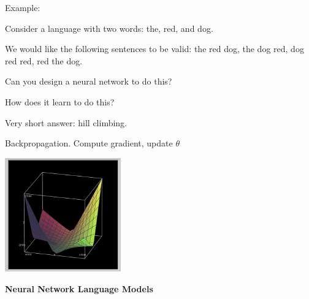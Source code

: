 \documentclass{beamer}
\let\tempone\itemize
\let\temptwo\enditemize
\renewenvironment{itemize}{\tempone\addtolength{\itemsep}{0.5\baselineskip}}{\temptwo}
\newcommand{\air}{\vspace{0.25cm}}
\begin{document}
\begin{frame}
  Example:
  
  \begin{itemize}
  \item Consider a language with two words: the, red, and dog. 
  \item We would like the following sentences to be valid: the red dog, the dog red, dog red red, red the dog.

  \item Can you design a neural network to do this?

  \end{itemize}

\end{frame}

\begin{frame}
  \begin{center}
    How does it learn to do this?
  \end{center}

  \begin{itemize}
  \item Very short answer: hill climbing.
    \air 
  \item Backpropagation. Compute gradient, update $\theta$ 
  \end{itemize}
  \begin{center}
    \includegraphics[width=5cm]{logbilinear}
  \end{center}
  
\end{frame}

\begin{frame}
  \begin{center}
    \textbf{Neural Network Language Models}
  \end{center}
\end{frame}


\end{document}
